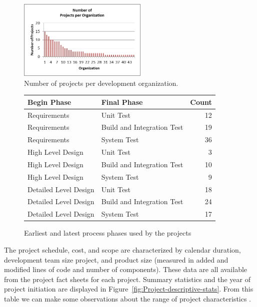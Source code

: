 \documentclass[smallcondensed]{svjour3}
\begin{document}
 
\begin{figure}[!t] 
\begin{center}
\includegraphics[height=1.5in]{number_of_projects_per_org.png}
\end{center} 
\caption{Number of projects per development organization.}
\label{fig:number of projects per organization}
\end{figure}


 
 
 \begin{figure}[ht]
\scriptsize
\centering
\begin{tabular}{llr} 
 Begin Phase &  Final Phase & Count  \\\hline
  Requirements      & Unit Test                   & 12  \\ 
  Requirements      & Build and Integration Test  & 19  \\ 
  Requirements      & System Test                 & 36  \\ 
  High Level Design & Unit Test                   & 3  \\ 
  High Level Design & Build and Integration Test  & 10  \\ 
  High Level Design & System Test                 & 9  \\ 
  Detailed Level Design & Unit Test                   & 18  \\ 
  Detailed Level Design & Build and Integration Test  & 24  \\ 
  Detailed Level Design & System Test                 & 17  \\ 
\end{tabular}
\caption{Earliest and latest process phases used by the projects}
\label{fig:earliest-and-least-process-phases}
\end{figure}
 


 
 The project schedule, cost, and scope  are characterized by calendar duration, development team size project, and product size (measured in added and modified lines of code and number of components).  These data are all available from the project fact sheets for each project. Summary statistics and the year of project initiation are displayed in Figure~\ref{fig:Project-descriptive-stats}. From this table we can make some observations about the range of project characteristics .
 
\end{document}
